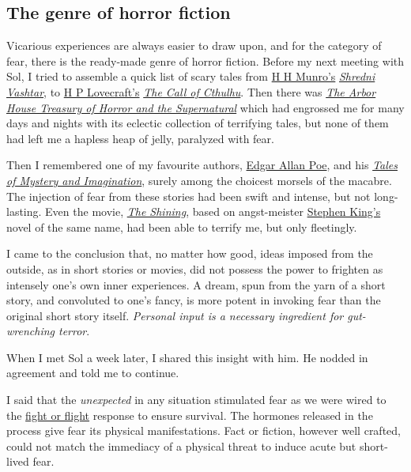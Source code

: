 \documentclass[
  a4paper,
]{article}
\begin{document}
\hypertarget{the-genre-of-horror-fiction}{%
\subsection{The genre of horror
fiction}\label{the-genre-of-horror-fiction}}

Vicarious experiences are always easier to draw upon, and for the
category of fear, there is the ready-made genre of horror fiction.
Before my next meeting with Sol, I tried to assemble a quick list of
scary tales from
\href{https://americanliterature.com/author/hh-munro-saki}{H H Munro's}
\href{https://www.classicshorts.com/stories/vashtar.html}{\emph{Shredni
Vashtar}}, to \href{https://www.hplovecraft.com/}{H P Lovecraft's}
\href{https://www.hplovecraft.com/writings/texts/fiction/cc.aspx}{\emph{The
Call of Cthulhu}}. Then there was
\href{https://openlibrary.org/books/OL4122966M/The_Arbor_House_treasury_of_horror_and_the_supernatural}{\emph{The
Arbor House Treasury of Horror and the Supernatural}} which had
engrossed me for many days and nights with its eclectic collection of
terrifying tales, but none of them had left me a hapless heap of jelly,
paralyzed with fear.

Then I remembered one of my favourite authors,
\href{https://www.poetryfoundation.org/poets/edgar-allan-poe}{Edgar
Allan Poe}, and his
\href{https://www.amazon.in/Tales-Mystery-Imagination-Collins-Classics/dp/0007420226}{\emph{Tales
of Mystery and Imagination}}, surely among the choicest morsels of the
macabre. The injection of fear from these stories had been swift and
intense, but not long-lasting. Even the movie,
\href{https://www.imdb.com/title/tt0081505/}{\emph{The Shining}}, based
on angst-meister
\href{https://www.britannica.com/biography/Stephen-King}{Stephen King's}
novel of the same name, had been able to terrify me, but only
fleetingly.

I came to the conclusion that, no matter how good, ideas imposed from
the outside, as in short stories or movies, did not possess the power to
frighten as intensely one's own inner experiences. A dream, spun from
the yarn of a short story, and convoluted to one's fancy, is more potent
in invoking fear than the original short story itself. \emph{Personal
input is a necessary ingredient for gut-wrenching terror}.

When I met Sol a week later, I shared this insight with him. He nodded
in agreement and told me to continue.

I said that the \emph{unexpected} in any situation stimulated fear as we
were wired to the
\href{https://www.verywellmind.com/what-is-the-fight-or-flight-response-2795194}{fight
or flight} response to ensure survival. The hormones released in the
process give fear its physical manifestations. Fact or fiction, however
well crafted, could not match the immediacy of a physical threat to
induce acute but short-lived fear.
\end{document}
